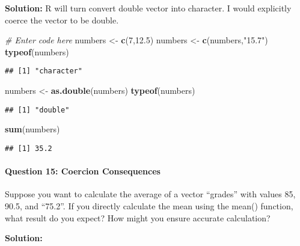 \documentclass[
]{article}
\newenvironment{Shaded}{\begin{snugshade}}{\end{snugshade}}
\newcommand{\CommentTok}[1]{\textcolor[rgb]{0.56,0.35,0.01}{\textit{#1}}}
\newcommand{\DecValTok}[1]{\textcolor[rgb]{0.00,0.00,0.81}{#1}}
\newcommand{\FloatTok}[1]{\textcolor[rgb]{0.00,0.00,0.81}{#1}}
\newcommand{\FunctionTok}[1]{\textcolor[rgb]{0.13,0.29,0.53}{\textbf{#1}}}
\newcommand{\NormalTok}[1]{#1}
\newcommand{\OtherTok}[1]{\textcolor[rgb]{0.56,0.35,0.01}{#1}}
\newcommand{\StringTok}[1]{\textcolor[rgb]{0.31,0.60,0.02}{#1}}
\begin{document}
\textbf{Solution:} R will turn convert double vector into character. I
would explicitly coerce the vector to be double.

\begin{Shaded}
\begin{Highlighting}[]
\CommentTok{\# Enter code here}
\NormalTok{numbers }\OtherTok{\textless{}{-}} \FunctionTok{c}\NormalTok{(}\DecValTok{7}\NormalTok{,}\FloatTok{12.5}\NormalTok{)}
\NormalTok{numbers }\OtherTok{\textless{}{-}} \FunctionTok{c}\NormalTok{(numbers,}\StringTok{"15.7"}\NormalTok{)}
\FunctionTok{typeof}\NormalTok{(numbers)}
\end{Highlighting}
\end{Shaded}

\begin{verbatim}
## [1] "character"
\end{verbatim}

\begin{Shaded}
\begin{Highlighting}[]
\NormalTok{numbers }\OtherTok{\textless{}{-}} \FunctionTok{as.double}\NormalTok{(numbers)}
\FunctionTok{typeof}\NormalTok{(numbers)}
\end{Highlighting}
\end{Shaded}

\begin{verbatim}
## [1] "double"
\end{verbatim}

\begin{Shaded}
\begin{Highlighting}[]
\FunctionTok{sum}\NormalTok{(numbers)}
\end{Highlighting}
\end{Shaded}

\begin{verbatim}
## [1] 35.2
\end{verbatim}

\hypertarget{question-15-coercion-consequences}{%
\paragraph{Question 15: Coercion
Consequences}\label{question-15-coercion-consequences}}

Suppose you want to calculate the average of a vector ``grades'' with
values 85, 90.5, and ``75.2''. If you directly calculate the mean using
the mean() function, what result do you expect? How might you ensure
accurate calculation?

\textbf{Solution:}
\end{document}
